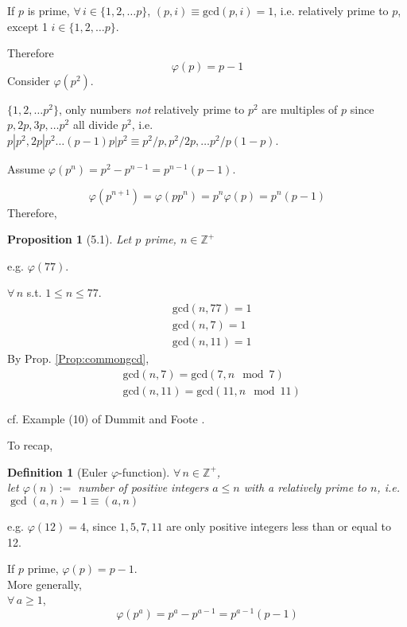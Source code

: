 \documentclass[10pt]{amsart}
\newtheorem{proposition}{Proposition}
\newtheorem{definition}{Definition}
\begin{document}
\begin{multicols*}{2}
If $p$ is prime, $\forall \, i \in \lbrace 1,2,\dots p \rbrace$, $(p,i) \equiv \text{gcd}(p,i)=1$, i.e. relatively prime to $p$, except 1 $i\in \lbrace 1,2,\dots p\rbrace$.  

Therefore 
\[
\varphi(p) = p-1
\]
Consider $\varphi(p^2)$.  

$\lbrace 1,2,\dots p^2\rbrace$, only numbers \emph{not} relatively prime to $p^2$ are multiples of $p$ since \\
$p,2p, 3p, \dots p^2$ all divide $p^2$, i.e. $p|p^2, 2p|p^2 \dots (p-1)p | p^2 \equiv p^2 /p , p^2 /2p , \dots p^2 / p(1-p)$.  

Assume $\varphi(p^n) = p^2 - p^{n-1} = p^{n-1}(p-1)$.  

\[
\varphi(p^{n+1}) = \varphi(pp^{n}) = p^n\varphi(p) = p^n(p-1)
\]
Therefore,
\begin{proposition}[5.1]
Let $p$ prime, $n\in \mathbb{Z}^+$
\end{proposition}


e.g. $\varphi(77)$.  

$\forall \, n $ s.t. $1\leq n \leq 77$.  
\[
\begin{aligned}
	& \text{gcd}(n,77)=1 \\ 
	& \text{gcd}(n,7)=1 \\ 
	& \text{gcd}(n,11)=1  
\end{aligned}
\]
By Prop. \ref{Prop:commongcd}, 
\[
\begin{aligned}
	& \text{gcd}(n,7) = \text{gcd}(7, n\mod{7}) \\ 
	& \text{gcd}(n,11) = \text{gcd}(11, n\mod{11}) 
\end{aligned}
\]

cf. Example (10) of Dummit and Foote \cite{DuFo2003}.  

To recap, 
\begin{definition}[Euler $\varphi$-function]
$\forall \, n \in \mathbb{Z}^+$, \\
let $\varphi(n)  := $ number of positive integers $a \leq n$ with a relatively prime to $n$, i.e. $\gcd(a,n) = 1 \equiv (a,n)$
\end{definition}
e.g. $\varphi(12)=4$, since $1,5,7,11$ are only positive integers less than or equal to 12.  

If $p$ prime, 
$\varphi(p) = p-1$.  \\
More generally, \\
$\forall \, a \geq 1$, 
\begin{equation}\label{Eq:EulerTotientOfPrimeFactor}
\boxed{ \varphi(p^a) = p^a - p^{a-1} = p^{a-1} (p-1) }
\end{equation}


\end{multicols*}
\end{document}
